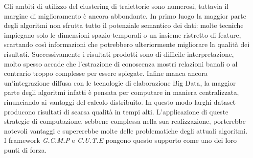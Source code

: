 Gli ambiti di utilizzo del clustering di traiettorie sono numerosi, tuttavia il margine di miglioramento
è ancora abbondante.
In primo luogo la maggior parte degli algoritmi non sfrutta tutto il potenziale semantico dei dati:
molte tecniche impiegano solo le dimensioni spazio-temporali o un insieme ristretto di feature,
scartando così informazioni che potrebbero ulteriormente migliorare la qualità dei risultati.
Successivamente i risultati prodotti sono di difficile interpretazione, molto spesso accade che
l'estrazione di conoscenza mostri relazioni banali o al contrario troppo complesse per essere spiegate.
Infine manca ancora un'integrazione diffusa con le tecnologie di elaborazione Big Data,
la maggior parte degli algoritmi infatti è pensata per computare in maniera centralizzata, rinunciando
ai vantaggi del calcolo distribuito.
In questo modo larghi dataset producono risultati di scarsa
qualità in tempi alti.
L'applicazione di queste strategie di computazione, sebbene complessa nella sua realizzazione, porterebbe
notevoli vantaggi e supererebbe molte delle problematiche degli attuali algoritmi.
I framework \textit{G.C.M.P}\cite{DBLP:journals/pvldb/FanZWT16} e \textit{C.U.T.E} pongono questo
supporto come uno dei loro punti di forza.


